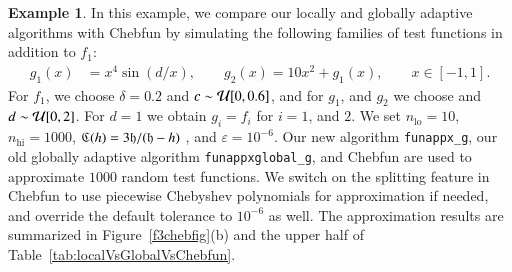 \documentclass[review]{elsarticle}
\newcommand{\abstol}{\varepsilon}
\theoremstyle{definition}
\newtheorem{exmp}{Example}
\begin{document}

\begin{exmp}
In this example, we compare our locally and globally adaptive algorithms with Chebfun by
simulating the following families of test functions  in addition to $f_1$:
%
\begin{align*}
 g_1(x) &= x^4 \sin(d/x), \qquad
 g_2(x) = 10  x^2 + g_1(x), \qquad x \in [-1, 1].
\end{align*}
For $f_1$, we choose $\delta = 0.2$ and $c \sim \mathcal{U}[0,0.6]$, and for $g_1$, and
$g_2$ we choose and $d \sim \mathcal{U}[0,2]$. For $d=1$ we obtain $g_i = f_i$ for
$i=1$, and $2$. We set $n_{\text{lo}} = 10$, $n_{\text{hi}} = 1000$, $\mathfrak{C} (h) =
3 \mathfrak{h}/(\mathfrak{h}-h)$ , and $\abstol = 10^{-6}$. Our new algorithm \texttt{funappx\_g},
our old globally adaptive algorithm \texttt{funappxglobal\_g}, and Chebfun are
used to approximate $1000$ random test functions. We switch on the splitting
feature in Chebfun to use piecewise Chebyshev polynomials for approximation if
needed, and override the default tolerance to $10^{-6}$ as well. The
approximation results are summarized in Figure~\ref{f3chebfig}(b) and the upper half of
Table~\ref{tab:localVsGlobalVsChebfun}.

%


\end{exmp}
\end{document}
